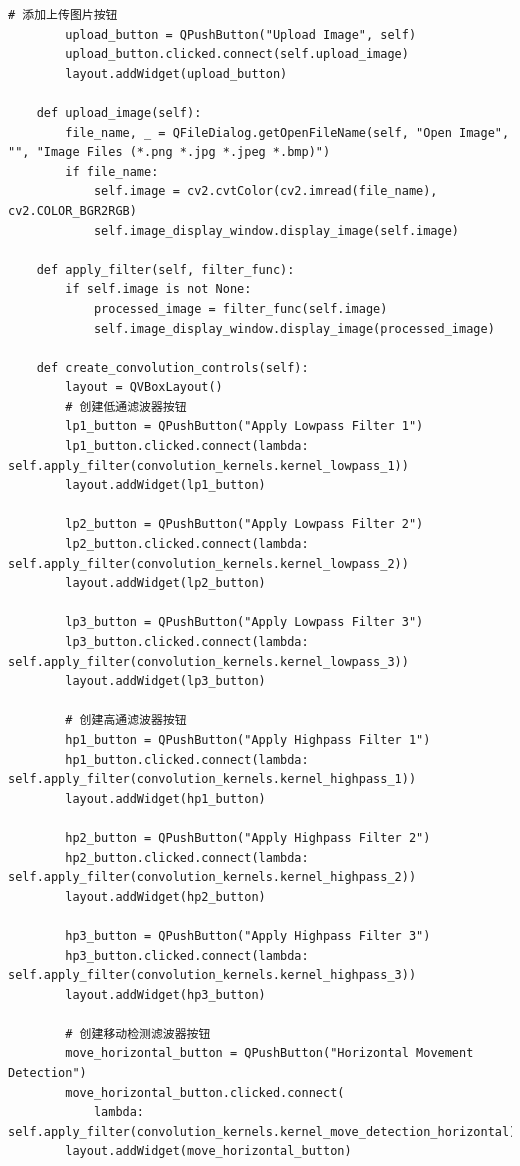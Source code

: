 \documentclass[a4paper,12pt]{article}
\begin{document}
\begin{lstlisting}[style=python]
        # 添加上传图片按钮
        upload_button = QPushButton("Upload Image", self)
        upload_button.clicked.connect(self.upload_image)
        layout.addWidget(upload_button)

    def upload_image(self):
        file_name, _ = QFileDialog.getOpenFileName(self, "Open Image", "", "Image Files (*.png *.jpg *.jpeg *.bmp)")
        if file_name:
            self.image = cv2.cvtColor(cv2.imread(file_name), cv2.COLOR_BGR2RGB)
            self.image_display_window.display_image(self.image)

    def apply_filter(self, filter_func):
        if self.image is not None:
            processed_image = filter_func(self.image)
            self.image_display_window.display_image(processed_image)

    def create_convolution_controls(self):
        layout = QVBoxLayout()
        # 创建低通滤波器按钮
        lp1_button = QPushButton("Apply Lowpass Filter 1")
        lp1_button.clicked.connect(lambda: self.apply_filter(convolution_kernels.kernel_lowpass_1))
        layout.addWidget(lp1_button)

        lp2_button = QPushButton("Apply Lowpass Filter 2")
        lp2_button.clicked.connect(lambda: self.apply_filter(convolution_kernels.kernel_lowpass_2))
        layout.addWidget(lp2_button)

        lp3_button = QPushButton("Apply Lowpass Filter 3")
        lp3_button.clicked.connect(lambda: self.apply_filter(convolution_kernels.kernel_lowpass_3))
        layout.addWidget(lp3_button)

        # 创建高通滤波器按钮
        hp1_button = QPushButton("Apply Highpass Filter 1")
        hp1_button.clicked.connect(lambda: self.apply_filter(convolution_kernels.kernel_highpass_1))
        layout.addWidget(hp1_button)

        hp2_button = QPushButton("Apply Highpass Filter 2")
        hp2_button.clicked.connect(lambda: self.apply_filter(convolution_kernels.kernel_highpass_2))
        layout.addWidget(hp2_button)

        hp3_button = QPushButton("Apply Highpass Filter 3")
        hp3_button.clicked.connect(lambda: self.apply_filter(convolution_kernels.kernel_highpass_3))
        layout.addWidget(hp3_button)

        # 创建移动检测滤波器按钮
        move_horizontal_button = QPushButton("Horizontal Movement Detection")
        move_horizontal_button.clicked.connect(
            lambda: self.apply_filter(convolution_kernels.kernel_move_detection_horizontal))
        layout.addWidget(move_horizontal_button)


\end{lstlisting}
\end{document}
